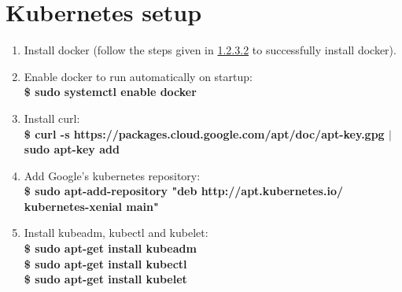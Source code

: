 \documentclass[12pt]{report}
\begin{document}
\section{Kubernetes setup}
\begin{enumerate}
	\item Install docker (follow the steps given in \hyperref[sec:dockerinstall]{1.2.3.2} to successfully install docker).
	\item Enable docker to run automatically on startup:\\
	\textbf{\$ sudo systemctl enable docker}
	\item Install curl:\\
	\textbf{\$ curl -s https://packages.cloud.google.com/apt/doc/apt-key.gpg $\vert$ sudo apt-key add}
	\item Add Google’s kubernetes repository:\\
	\textbf{\$ sudo apt-add-repository "deb http://apt.kubernetes.io/ kubernetes-xenial main"}
	\item Install kubeadm, kubectl and kubelet:\\
	\textbf{\$ sudo apt-get install kubeadm}\\
	\textbf{\$ sudo apt-get install kubectl}\\
	\textbf{\$ sudo apt-get install kubelet}
\end{enumerate}
\end{document}
